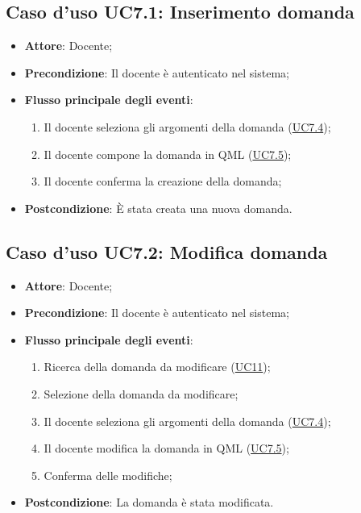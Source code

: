 \documentclass[12pt,a4paper]{article}
\begin{document}
\subsection{Caso d'uso UC7.1: Inserimento domanda}

\begin{itemize}

\item \textbf{Attore}: Docente; 
\item \textbf{Precondizione}: Il docente è autenticato nel sistema;

\item \textbf{Flusso principale degli eventi}:
\begin{enumerate}
	\item Il docente seleziona gli argomenti della domanda (\hyperlink{UC7.4}{UC7.4});
	\item Il docente compone la domanda in QML  (\hyperlink{UC7.5}{UC7.5});
	\item Il docente conferma la creazione della domanda;
	
\end{enumerate}
\item \textbf{Postcondizione}: È stata creata una nuova domanda.
\end{itemize}
\hypertarget{UC7.2}{}
\subsection{Caso d'uso UC7.2: Modifica domanda}

\begin{itemize}

\item \textbf{Attore}: Docente; 
\item \textbf{Precondizione}: Il docente è autenticato nel sistema;

\item \textbf{Flusso principale degli eventi}:
\begin{enumerate}
	\item Ricerca della domanda da modificare (\hyperlink{UC11}{UC11});
	\item Selezione della domanda da modificare;
	\item Il docente seleziona gli argomenti della domanda	 (\hyperlink{UC7.4}{UC7.4});
	\item Il docente modifica la domanda in QML	 (\hyperlink{UC7.5}{UC7.5});
	\item Conferma delle modifiche;
	
\end{enumerate}
\item \textbf{Postcondizione}: La domanda è stata modificata.
\end{itemize}
\hypertarget{UC7.3}{}
\end{document}
